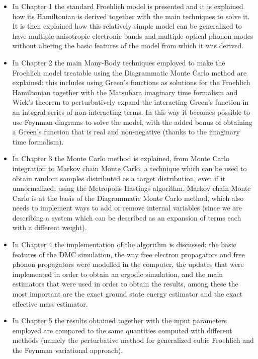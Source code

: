 \begin{itemize}
    \item In Chapter 1 the standard Froehlich model is presented and it is explained how its Hamiltonian is derived together with the main techniques to 
    solve it. It is then explained how this relatively simple model can be generalized to have multiple anisotropic electronic bands 
    and multiple optical phonon modes without altering the basic features of the model from which it was derived.
    \item In Chapter 2 the main Many-Body techniques employed to make the Froehlich model treatable using the Diagrammatic Monte Carlo 
    method are explained: this includes using Green's functions as solutions for the Froehlich Hamiltonian together with the Matsubara imaginary time 
    formalism and Wick's theorem to perturbatively expand the interacting Green's function in an integral series of non-interacting terms. In this way it becomes 
    possible to use Feynman diagrams to solve the model, with the added bonus of obtaining a Green's function that is real and non-negative (thanks to the imaginary time 
    formalism).
    \item In Chapter 3 the Monte Carlo method is explained, from Monte Carlo integration to Markov chain Monte Carlo, a technique which can 
    be used to obtain random samples distributed as a target distribution, even if it unnormalized, using the Metropolis-Hastings algorithm. Markov chain Monte Carlo is at the basis 
    of the Diagrammatic Monte Carlo method, which also needs to implement ways to add or remove internal variables (since we are describing a system 
    which can be described as an expansion of terms each with a different weight).
    \item  In Chapter 4 the implementation of the algorithm is discussed: the basic features of the DMC simulation, the way free electron propagators 
    and free phonon propagators were modelled in the computer, the updates that were implemented in order to obtain an ergodic simulation, and the main estimators 
    that were used in order to obtain the results, among these the most important are the exact ground state energy estimator and the exact 
    effective mass estimator.
    \item In Chapter 5 the results obtained together with the input parameters employed are compared to the same quantities computed with different methods (namely 
    the perturbative method for generalized cubic Froehlich and the Feynman variational approach).
\end{itemize}